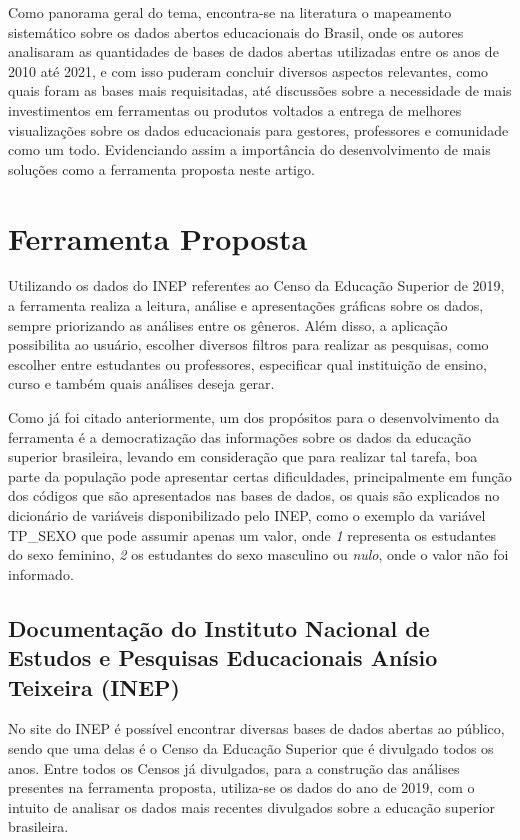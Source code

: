 \documentclass[12pt]{article}
\begin{document}
Como panorama geral do tema, encontra-se na literatura o mapeamento sistemático sobre os dados abertos educacionais do Brasil, onde os autores \cite{ferreira:2021} analisaram as quantidades de bases de dados abertas utilizadas entre os anos de 2010 até 2021, e com isso puderam concluir diversos aspectos relevantes, como quais foram as bases mais requisitadas, até discussões sobre a necessidade de mais investimentos em ferramentas ou produtos voltados a entrega de melhores visualizações sobre os dados educacionais para gestores, professores e comunidade como um todo. Evidenciando assim a importância do desenvolvimento de mais soluções como a ferramenta proposta neste artigo.

\section{Ferramenta Proposta}\label{ferramentaProposta}
Utilizando os dados do INEP referentes ao Censo da Educação Superior de 2019, a ferramenta realiza a leitura, análise e apresentações gráficas sobre os dados, sempre priorizando as análises entre os gêneros. Além disso, a aplicação possibilita ao usuário, escolher diversos filtros para realizar as pesquisas, como escolher entre estudantes ou professores, especificar qual instituição de ensino, curso e também quais análises deseja gerar.

Como já foi citado anteriormente, um dos propósitos para o desenvolvimento da ferramenta é a democratização das informações sobre os dados da educação superior brasileira, levando em consideração que para realizar tal tarefa, boa parte da população pode apresentar certas dificuldades, principalmente em função dos códigos que são apresentados nas bases de dados, os quais são explicados no dicionário de variáveis disponibilizado pelo INEP, como o exemplo da variável TP\_SEXO que pode assumir apenas um valor, onde  \textit{1} representa os estudantes do sexo feminino, \textit{2} os estudantes do sexo masculino ou \textit{nulo}, onde o valor não foi informado.

\subsection{Documentação do Instituto Nacional de Estudos e Pesquisas Educacionais Anísio Teixeira (INEP)}\label{documetacaoDados}
No site do INEP é possível encontrar diversas bases de dados abertas ao público, sendo que uma delas é o Censo da Educação Superior que é divulgado todos os anos. Entre todos os Censos já divulgados, para a construção das análises presentes na ferramenta proposta, utiliza-se os dados do ano de 2019, com o intuito de analisar os dados mais recentes divulgados sobre a educação superior brasileira.
\end{document}
